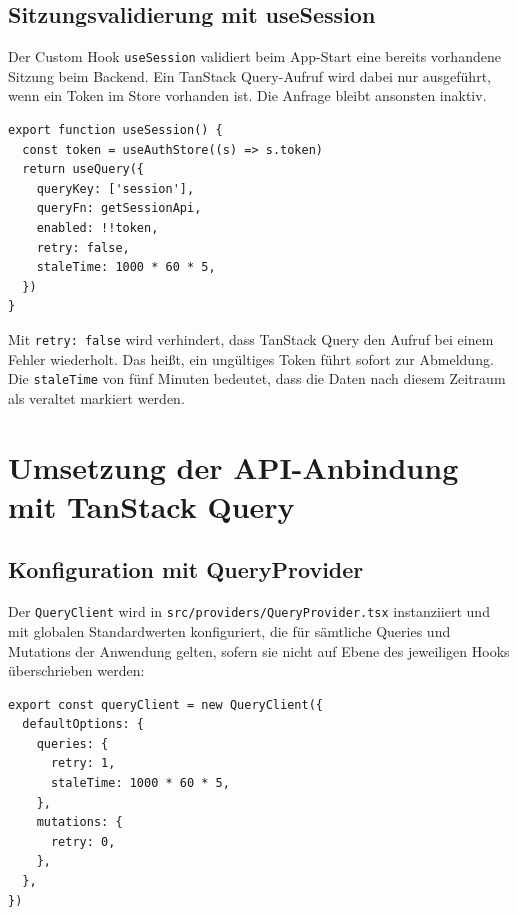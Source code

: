 \subsection{Sitzungsvalidierung mit useSession}

Der Custom Hook \texttt{useSession} validiert beim App-Start eine bereits vorhandene Sitzung
beim Backend. Ein TanStack Query-Aufruf wird dabei nur ausgeführt, wenn ein Token 
im Store vorhanden ist. Die Anfrage bleibt ansonsten inaktiv.

\begin{listing}[H]
\begin{verbatim}
export function useSession() {
  const token = useAuthStore((s) => s.token)
  return useQuery({
    queryKey: ['session'],
    queryFn: getSessionApi,
    enabled: !!token,
    retry: false,
    staleTime: 1000 * 60 * 5,
  })
}
\end{verbatim}
\caption{useSession Hook}
\label{lst:use-session}
\end{listing}

Mit \texttt{retry: false} wird verhindert, dass TanStack Query den Aufruf bei einem Fehler
wiederholt. Das heißt, ein ungültiges Token führt sofort zur Abmeldung. Die \texttt{staleTime}
von fünf Minuten bedeutet, dass die Daten nach diesem Zeitraum als veraltet markiert werden.

\section{Umsetzung der API-Anbindung mit TanStack Query}

\subsection{Konfiguration mit QueryProvider}

Der \texttt{QueryClient} wird in \texttt{src/providers/QueryProvider.tsx} instanziiert und
mit globalen Standardwerten konfiguriert, die für sämtliche Queries und Mutations der
Anwendung gelten, sofern sie nicht auf Ebene des jeweiligen Hooks überschrieben werden:

\begin{listing}[H]
\begin{verbatim}
export const queryClient = new QueryClient({
  defaultOptions: {
    queries: {
      retry: 1,
      staleTime: 1000 * 60 * 5,
    },
    mutations: {
      retry: 0,
    },
  },
})
\end{verbatim}
\caption{QueryClient-Konfiguration in QueryProvider.tsx}
\label{lst:query-client}
\end{listing}

